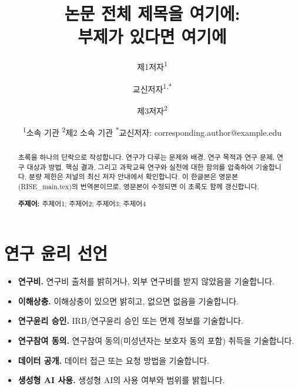 \documentclass[11pt,a4paper]{article}
\title{\textbf{논문 전체 제목을 여기에:\\
부제가 있다면 여기에}}
\author{제1저자\textsuperscript{1} \and 교신저자\textsuperscript{1,$*$} \and 제3저자\textsuperscript{2}}
\date{\normalsize \textsuperscript{1}소속 기관 \quad \textsuperscript{2}제2 소속 기관 \quad
  \textsuperscript{$*$}교신저자: corresponding.author@example.edu}
\begin{document}
\maketitle

\begin{abstract}
\noindent
초록을 하나의 단락으로 작성합니다. 연구가 다루는 문제와 배경, 연구 목적과 연구
문제, 연구 대상과 방법, 핵심 결과, 그리고 과학교육 연구와 실천에 대한 함의를
압축하여 기술합니다. 분량 제한은 저널의 최신 저자 안내에서 확인합니다. 이 한글본은
영문본(RISE\_main.tex)의 번역본이므로, 영문본이 수정되면 이 초록도 함께 갱신합니다.
\par\smallskip
\noindent\textbf{주제어:} 주제어1; 주제어2; 주제어3; 주제어4
\end{abstract}


\section{연구 윤리 선언}
\begin{itemize}
  \item \textbf{연구비.} 연구비 출처를 밝히거나, 외부 연구비를 받지 않았음을 기술합니다.
  \item \textbf{이해상충.} 이해상충이 있으면 밝히고, 없으면 없음을 기술합니다.
  \item \textbf{연구윤리 승인.} IRB/연구윤리 승인 또는 면제 정보를 기술합니다.
  \item \textbf{연구참여 동의.} 연구참여 동의(미성년자는 보호자 동의 포함) 취득을 기술합니다.
  \item \textbf{데이터 공개.} 데이터 접근 또는 요청 방법을 기술합니다.
  \item \textbf{생성형 AI 사용.} 생성형 AI의 사용 여부와 범위를 밝힙니다.
\end{itemize}


\end{document}

